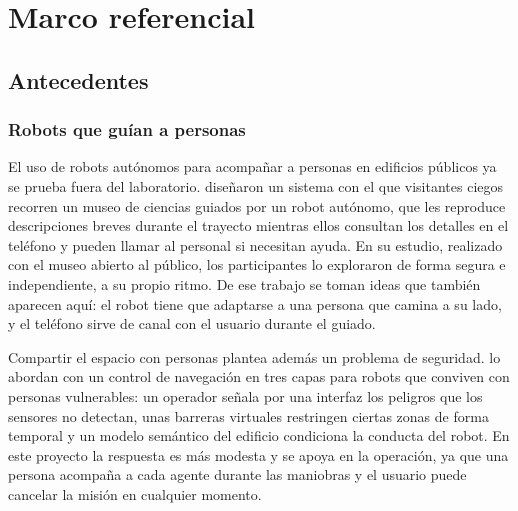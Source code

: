 \chapter{Marco referencial}
\label{cap:marco}

\section{Antecedentes}
\label{sec:antecedentes}

\subsection{Robots que guían a personas}

El uso de robots autónomos para acompañar a personas en edificios públicos ya se prueba
fuera del laboratorio. \textcite{kayukawa2023enhancing} diseñaron un sistema con el que
visitantes ciegos recorren un museo de ciencias guiados por un robot autónomo, que les
reproduce descripciones breves durante el trayecto mientras ellos consultan los detalles
en el teléfono y pueden llamar al personal si necesitan ayuda. En su estudio, realizado
con el museo abierto al público, los participantes lo exploraron de forma segura e
independiente, a su propio ritmo. De ese trabajo se toman ideas que también aparecen
aquí: el robot tiene que adaptarse a una persona que camina a su lado, y el teléfono
sirve de canal con el usuario durante el guiado.

Compartir el espacio con personas plantea además un problema de seguridad.
\textcite{omer2025multilayer} lo abordan con un control de navegación en tres capas para
robots que conviven con personas vulnerables: un operador señala por una interfaz los
peligros que los sensores no detectan, unas barreras virtuales restringen ciertas zonas
de forma temporal y un modelo semántico del edificio condiciona la conducta del robot.
En este proyecto la respuesta es más modesta y se apoya en la operación, ya que una
persona acompaña a cada agente durante las maniobras y el usuario puede cancelar la
misión en cualquier momento.


